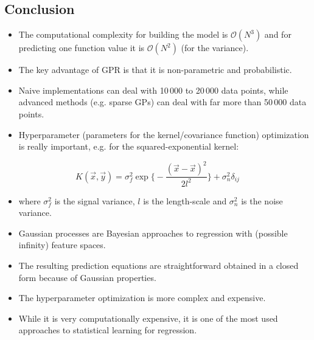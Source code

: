 		\subsection{Conclusion}
		    \begin{itemize}
		    	\item The computational complexity for building the model is \( \mathcal{O}(N^3) \) and for predicting one function value it is \(\mathcal{O}(N^2)\) (for the variance).
		    	\item The key advantage of GPR is that it is non-parametric and probabilistic.
		    	\item Naive implementations can deal with 10\,000 to 20\,000 data points, while advanced methods (e.g. sparse GPs) can deal with far more than 50\,000 data points.
		    	\item Hyperparameter (parameters for the kernel/covariance function) optimization is really important, e.g. for the squared-exponential kernel:
		    \end{itemize}
		    \begin{equation}
			    K(\vec{x}, \vec{y}) = \sigma_f^2 \exp \Bigg\{ -\frac{(\vec{x} - \vec{x})^2}{2l^2} \Bigg\} + \sigma_n^2 \delta_{ij}
		    \end{equation}
			\begin{itemize}
				\item[] where \( \sigma_f^2 \) is the signal variance, \(l\) is the length-scale and \(\sigma_n^2\) is the noise variance.
				\item Gaussian processes are Bayesian approaches to regression with (possible infinity) feature spaces.
				\item The resulting prediction equations are straightforward obtained in a closed form because of Gaussian properties.
				\item The hyperparameter optimization is more complex and expensive.
				\item While it is very computationally expensive, it is one of the most used approaches to statistical learning for regression.
			\end{itemize}
	
